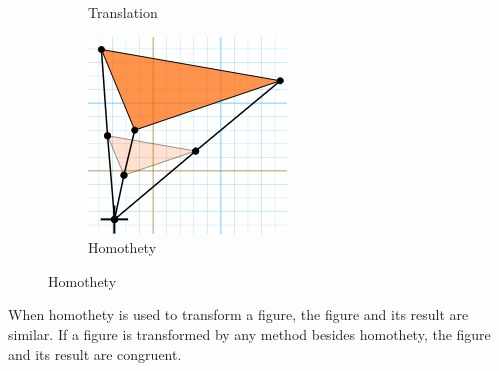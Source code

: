 \begin{figure} [hbt!]
\begin{subfigure}[b]{.45\linewidth}
            \caption*{Translation}
        \end{subfigure}
        \begin{subfigure}[b]{.45\linewidth}
            \includegraphics[scale=0.5]{Resources/Unit5Transformations/homothety.PNG}
            \caption*{Homothety}
        \end{subfigure}
    \end{figure}

    \noindent When homothety is used to transform a figure, the figure and its result are
    similar. If a figure is transformed by any method besides homothety, the figure and its
    result are congruent.